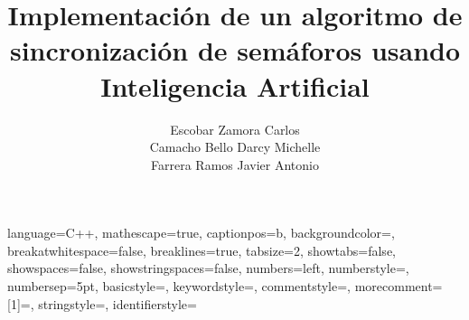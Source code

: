 \documentclass[letterpaper,12pt,openany]{book}
\begin{document}
\author{Escobar Zamora Carlos\\Camacho Bello Darcy Michelle\\Farrera Ramos Javier Antonio}
\title{Implementación de un algoritmo de sincronización de semáforos usando Inteligencia Artificial}



{\setlength{\baselineskip}{1.1\baselineskip}
\tableofcontents
\listoffigures}



{
	language=C++,
	mathescape=true,
	captionpos=b,
	backgroundcolor=\color{background},
	breakatwhitespace=false,
	breaklines=true,
	tabsize=2,
	showtabs=false,
	showspaces=false,
	showstringspaces=false,
	numbers=left, numberstyle=\tiny\color{numbercolor}, numbersep=5pt,
	basicstyle=\footnotesize\ttfamily,
	keywordstyle=\color[HTML]{0071A8}, %
	commentstyle=\color[HTML]{777777},
	morecomment=[1]=\color{Crimson},
	stringstyle=\color[HTML]{534bae},
	identifierstyle=\color[HTML]{C30000} %
}

\setlength{\parindent}{0pt}
\setlength{\parskip}{1ex plus 0.5ex minus 0.2ex}
\setlength{\baselineskip}{1.5\baselineskip}











\appendix





\end{document}
